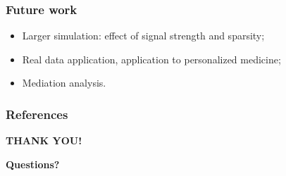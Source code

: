 \documentclass[10pt]{beamer}
\theoremstyle{definition}
\newcommand{\colubf}{\color{UniBlue}\bf}
\begin{document}
\begin{frame}
\frametitle{Future work}

\begin{itemize}
\item Larger simulation: effect of signal strength and sparsity;
\vspace{1em}

\item Real data application, application to personalized medicine;
\vspace{1em}

\item Mediation analysis.
\end{itemize}
\end{frame}

\begin{frame}
\frametitle{References}
{\scriptsize


}
\end{frame}


\begin{frame}
\centering
{\huge\textcolor{UniBlue}{\textbf{THANK YOU!}}}\\

\vspace{2em}

\vspace{1em}
{\colubf Questions?}
\end{frame}
\end{document}
